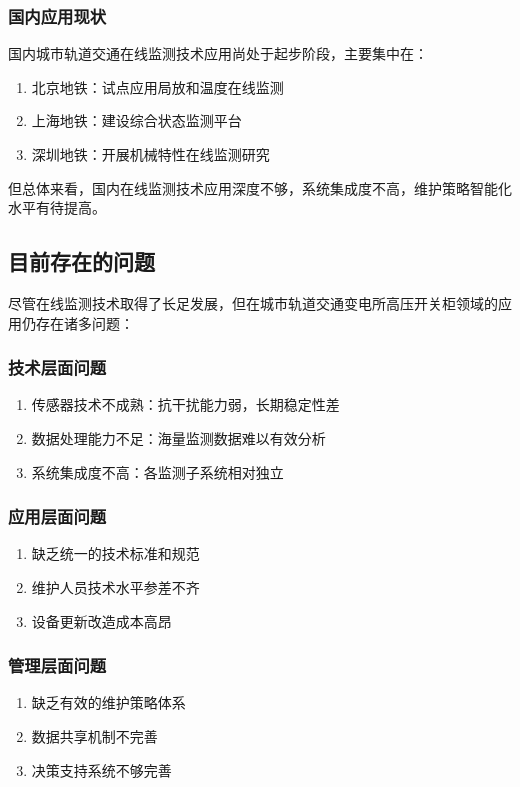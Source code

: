 \subsubsection{国内应用现状}

国内城市轨道交通在线监测技术应用尚处于起步阶段，主要集中在：
\begin{enumerate}
    \item 北京地铁：试点应用局放和温度在线监测
    \item 上海地铁：建设综合状态监测平台
    \item 深圳地铁：开展机械特性在线监测研究
\end{enumerate}

但总体来看，国内在线监测技术应用深度不够，系统集成度不高，维护策略智能化水平有待提高。

\subsection{目前存在的问题}

尽管在线监测技术取得了长足发展，但在城市轨道交通变电所高压开关柜领域的应用仍存在诸多问题：

\subsubsection{技术层面问题}
\begin{enumerate}
    \item 传感器技术不成熟：抗干扰能力弱，长期稳定性差
    \item 数据处理能力不足：海量监测数据难以有效分析
    \item 系统集成度不高：各监测子系统相对独立
\end{enumerate}

\subsubsection{应用层面问题}
\begin{enumerate}
    \item 缺乏统一的技术标准和规范
    \item 维护人员技术水平参差不齐
    \item 设备更新改造成本高昂
\end{enumerate}

\subsubsection{管理层面问题}
\begin{enumerate}
    \item 缺乏有效的维护策略体系
    \item 数据共享机制不完善
    \item 决策支持系统不够完善
\end{enumerate}

